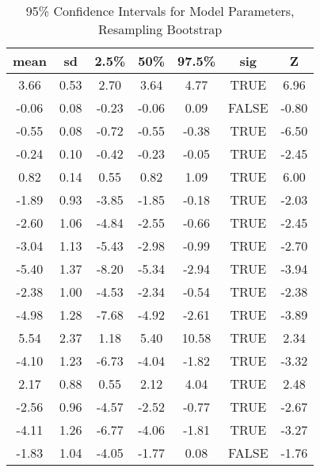 \begin{table}[hbp!]
\centering
\begin{tabular}{|c|c|c|c|c|c|c|}
  \hline
  \textbf{mean} & \textbf{sd} & \textbf{2.5\%} & \textbf{50\%} & \textbf{97.5\%} & \textbf{sig} & \textbf{Z} \\ 
  \hline
3.66 & 0.53 & 2.70 & 3.64 & 4.77 & TRUE & 6.96 \\ 
  -0.06 & 0.08 & -0.23 & -0.06 & 0.09 & FALSE & -0.80 \\ 
  -0.55 & 0.08 & -0.72 & -0.55 & -0.38 & TRUE & -6.50 \\ 
  -0.24 & 0.10 & -0.42 & -0.23 & -0.05 & TRUE & -2.45 \\ 
  0.82 & 0.14 & 0.55 & 0.82 & 1.09 & TRUE & 6.00 \\ 
  -1.89 & 0.93 & -3.85 & -1.85 & -0.18 & TRUE & -2.03 \\ 
  -2.60 & 1.06 & -4.84 & -2.55 & -0.66 & TRUE & -2.45 \\ 
  -3.04 & 1.13 & -5.43 & -2.98 & -0.99 & TRUE & -2.70 \\ 
  -5.40 & 1.37 & -8.20 & -5.34 & -2.94 & TRUE & -3.94 \\ 
  -2.38 & 1.00 & -4.53 & -2.34 & -0.54 & TRUE & -2.38 \\ 
  -4.98 & 1.28 & -7.68 & -4.92 & -2.61 & TRUE & -3.89 \\ 
  5.54 & 2.37 & 1.18 & 5.40 & 10.58 & TRUE & 2.34 \\ 
  -4.10 & 1.23 & -6.73 & -4.04 & -1.82 & TRUE & -3.32 \\ 
  2.17 & 0.88 & 0.55 & 2.12 & 4.04 & TRUE & 2.48 \\ 
  -2.56 & 0.96 & -4.57 & -2.52 & -0.77 & TRUE & -2.67 \\ 
  -4.11 & 1.26 & -6.77 & -4.06 & -1.81 & TRUE & -3.27 \\ 
  -1.83 & 1.04 & -4.05 & -1.77 & 0.08 & FALSE & -1.76 \\ 
   \hline
\end{tabular}
   \caption{95\% Confidence Intervals for Model Parameters, Resampling Bootstrap}
\end{table}

